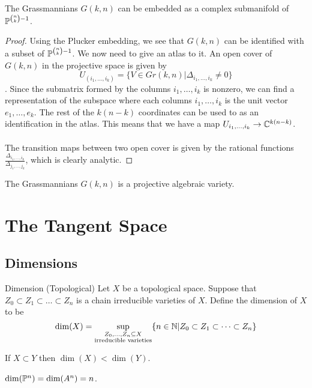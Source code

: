 \documentclass[a4paper]{article}
\begin{document}
\begin{thm}{}{} The Grassmannians $G(k,n)$ can be embedded as a complex submanifold of $\mathbb{P}^{\binom{n}{k}-1}$. \tcbline
\begin{proof}
Using the Plucker embedding, we see that $G(k,n)$ can be identified with a subset of $\mathbb{P}^{\binom{n}{k}-1}$. We now need to give an atlas to it. An open cover of $G(k,n)$ in the projective space is given by $$U_{(i_1,\dots,i_k)}=\{V\in Gr(k,n)|\Delta_{i_1,\dots,i_k}\neq 0\}$$. Since the submatrix formed by the columns $i_1,\dots,i_k$ is nonzero, we can find a representation of the subspace where each columns $i_1,\dots,i_k$ is the unit vector $e_1,\dots,e_k$. The rest of the $k(n-k)$ coordinates can be used to as an identification in the atlas. This means that we have a map $U_{i_1,\dots,i_k}\to\mathbb{C}^{k(n-k)}$. \\~\\
The transition maps between two open cover is given by the rational functions $\frac{\Delta_{i_1,\dots,i_k}}{\Delta_{j_1,\dots,j_k}}$, which is clearly analytic. 
\end{proof}
\end{thm}

\begin{thm}{}{} The Grassmannians $G(k,n)$ is a projective algebraic variety. 
\end{thm}


\pagebreak
\section{The Tangent Space}
\subsection{Dimensions}
\begin{defn}{Dimension (Topological)}{} Let $X$ be a topological space. Suppose that $Z_0\subset Z_1\subset\dots\subset Z_n$ is a chain irreducible varieties of $X$. Define the dimension of $X$ to be $$\dim(X)=\sup_{\substack{Z_0,\dots,Z_n\subseteq X\\\text{irreducible varieties}}}\{n\in\mathbb{N}|Z_0\subset Z_1\subset\dots\subset Z_n\}$$
\end{defn}

\begin{lmm}{}{} If $X\subset Y$ then $\dim(X)<\dim(Y)$. 
\end{lmm}

\begin{lmm}{}{} $\dim(\mathbb{P}^n)=\dim(A^n)=n$. 
\end{lmm}
\end{document}
